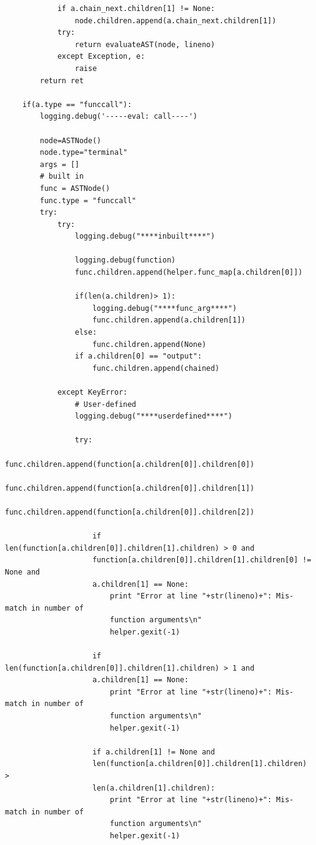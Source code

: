 \documentclass[a4paper]{article}
\begin{document}
\begin{verbatim}
            if a.chain_next.children[1] != None:
                node.children.append(a.chain_next.children[1])
            try:
                return evaluateAST(node, lineno)
            except Exception, e:
                raise                        
        return ret

    if(a.type == "funccall"):
        logging.debug('-----eval: call----')

        node=ASTNode()
        node.type="terminal"
        args = []
        # built in
        func = ASTNode()
        func.type = "funccall"
        try:
            try:
                logging.debug("****inbuilt****")
                
                logging.debug(function)
                func.children.append(helper.func_map[a.children[0]])

                if(len(a.children)> 1):
                    logging.debug("****func_arg****")
                    func.children.append(a.children[1])
                else:
                    func.children.append(None)
                if a.children[0] == "output":
                    func.children.append(chained)

            except KeyError:
                # User-defined
                logging.debug("****userdefined****")

                try:
                    func.children.append(function[a.children[0]].children[0])   
                    func.children.append(function[a.children[0]].children[1])    
                    func.children.append(function[a.children[0]].children[2])    

                    if len(function[a.children[0]].children[1].children) > 0 and 
                    function[a.children[0]].children[1].children[0] != None and 
                    a.children[1] == None:
                        print "Error at line "+str(lineno)+": Mis-match in number of 
                        function arguments\n"
                        helper.gexit(-1)

                    if len(function[a.children[0]].children[1].children) > 1 and 
                    a.children[1] == None:
                        print "Error at line "+str(lineno)+": Mis-match in number of 
                        function arguments\n"
                        helper.gexit(-1)
    
                    if a.children[1] != None and 
                    len(function[a.children[0]].children[1].children) > 
                    len(a.children[1].children):
                        print "Error at line "+str(lineno)+": Mis-match in number of 
                        function arguments\n"
                        helper.gexit(-1)
    

\end{verbatim}
\end{document}
